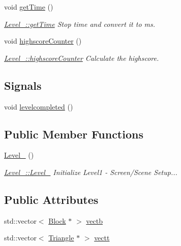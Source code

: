 \begin{DoxyCompactItemize}
void \hyperlink{class_level__4_a26de79cece6c4608a509536bffdd949b}{get\+Time} ()
\begin{DoxyCompactList}\small\item\em \hyperlink{class_level__4_a26de79cece6c4608a509536bffdd949b}{Level\+\_\+::get\+Time} Stop time and convert it to ms. \end{DoxyCompactList}\item 
void \hyperlink{class_level__4_af2b343d37c3cab79ac019829aec273f5}{highscore\+Counter} ()
\begin{DoxyCompactList}\small\item\em \hyperlink{class_level__4_af2b343d37c3cab79ac019829aec273f5}{Level\+\_\+::highscore\+Counter} Calculate the highscore. \end{DoxyCompactList}\end{DoxyCompactItemize}
\subsection*{Signals}
\begin{DoxyCompactItemize}
\item 
void \hyperlink{class_level__4_a2afa1fbae0eadf9ee46383e85e6bb427}{levelcompleted} ()
\end{DoxyCompactItemize}
\subsection*{Public Member Functions}
\begin{DoxyCompactItemize}
\item 
\hyperlink{class_level__4_a30aa6842c7bac97cace91542d68a9fc5}{Level\+\_} ()
\begin{DoxyCompactList}\small\item\em \hyperlink{class_level__4_a30aa6842c7bac97cace91542d68a9fc5}{Level\+\_\+::\+Level\+\_} Initialize Level1 -\/ Screen/\+Scene Setup... \end{DoxyCompactList}\end{DoxyCompactItemize}
\subsection*{Public Attributes}
\begin{DoxyCompactItemize}
\item 
std\+::vector$<$ \hyperlink{class_block}{Block} $\ast$ $>$ \hyperlink{class_level__4_a7405e54cfaa0373b5114d838f0f39cc7}{vectb}
\item 
std\+::vector$<$ \hyperlink{class_triangle}{Triangle} $\ast$ $>$ \hyperlink{class_level__4_acdd42e79e1b0dbd8bddce42277a20984}{vectt}
\end{DoxyCompactItemize}


